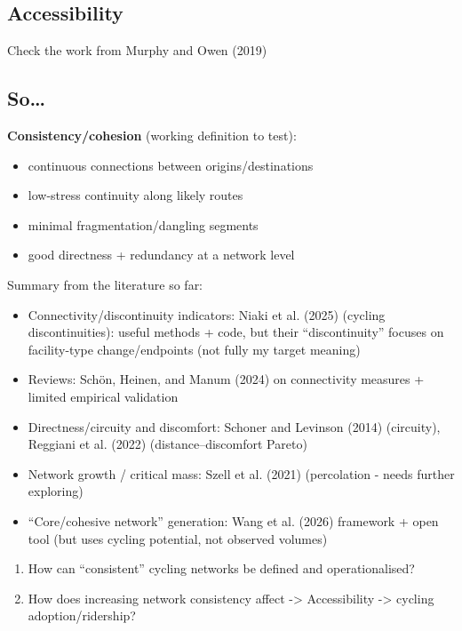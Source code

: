 \documentclass[
  sn-nature,
]{sn-jnl}
\providecommand{\tightlist}{%
  \setlength{\itemsep}{0pt}\setlength{\parskip}{0pt}}
\begin{document}
\subsection{Accessibility}\label{accessibility}

Check the work from Murphy and Owen (2019)

\subsection{So\ldots{}}\label{so}

\textbf{Consistency/cohesion} (working definition to test):

\begin{itemize}
\item
  continuous connections between origins/destinations
\item
  low-stress continuity along likely routes
\item
  minimal fragmentation/dangling segments
\item
  good directness + redundancy at a network level
\end{itemize}

Summary from the literature so far:

\begin{itemize}
\item
  Connectivity/discontinuity indicators: Niaki et al. (2025) (cycling
  discontinuities): useful methods + code, but their ``discontinuity''
  focuses on facility-type change/endpoints (not fully my target
  meaning)
\item
  Reviews: Schön, Heinen, and Manum (2024) on connectivity measures +
  limited empirical validation
\item
  Directness/circuity and discomfort: Schoner and Levinson (2014)
  (circuity), Reggiani et al. (2022) (distance--discomfort Pareto)
\item
  Network growth / critical mass: Szell et al. (2021) (percolation -
  needs further exploring)
\item
  ``Core/cohesive network'' generation: Wang et al. (2026) framework +
  open tool (but uses cycling potential, not observed volumes)
\end{itemize}

\begin{enumerate}
\def\labelenumi{\arabic{enumi}.}
\tightlist
\item
  How can ``consistent'' cycling networks be defined and
  operationalised?
\item
  How does increasing network consistency affect -\textgreater{}
  Accessibility -\textgreater{} cycling adoption/ridership?
\end{enumerate}
\end{document}
